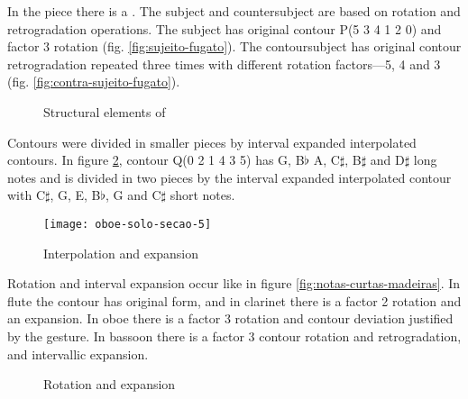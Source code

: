In the piece there is a . The subject and countersubject
are based on rotation and retrogradation operations. The subject has
original contour P(5 3 4 1 2 0) and factor 3 rotation
(fig. \ref{fig:sujeito-fugato}). The contoursubject has original
contour retrogradation repeated three times with different rotation
factors---5, 4 and 3 (fig. \ref{fig:contra-sujeito-fugato}).

\begin{figure}
  \centering

  \caption{Structural elements of }
  \label{fig:elementos-fugato}
\end{figure}

Contours were divided in smaller pieces by interval expanded
interpolated contours. In figure \ref{fig:interpolacao-expansao},
contour Q(0 2 1 4 3 5) has G, B$\flat$ A, C$\sharp$, B$\sharp$ and
D$\sharp$ long notes and is divided in two pieces by the interval
expanded interpolated contour with C$\sharp$, G, E, B$\flat$, G and
C$\sharp$ short notes.

\begin{figure}[!p]
  \centering
  \texttt{[image: oboe-solo-secao-5]}
  \caption{Interpolation and expansion}
  \label{fig:interpolacao-expansao}
\end{figure}

Rotation and interval expansion occur like in figure
\ref{fig:notas-curtas-madeiras}. In flute the contour has original
form, and in clarinet there is a factor 2 rotation and an
expansion. In oboe there is a factor 3 rotation and contour deviation
justified by the gesture. In bassoon there is a factor 3 contour
rotation and retrogradation, and intervallic expansion.

\begin{figure}[!p]
  \centering

  \subfloat[original]{
    \texttt{[image: c-534120]}
    \label{fig:rot-0}
  }
  \subfloat[rot 2]{
    \texttt{[image: c-412053]}
    \label{fig:rot-2}
  }
  \subfloat[rot 3]{
    \texttt{[image: c-120534]}
    \label{fig:rot-3}
  }
  \caption{Rotation and expansion}
  \label{fig:rotacao-expansao}
\end{figure}


